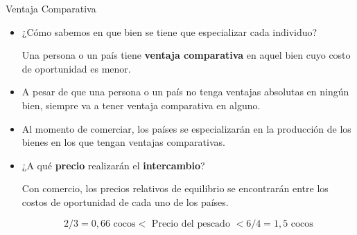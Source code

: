 \documentclass{beamer}
\begin{document}
\begin{frame}{Ventaja Comparativa}
    \begin{itemize}
        \item ¿Cómo sabemos en que bien se tiene que especializar cada individuo?
        \begin{boxB}
            \centering
            Una persona o un país tiene \textbf{ventaja comparativa} en aquel bien cuyo costo de oportunidad es menor.
        \end{boxB}
        \item A pesar de que una persona o un país no tenga ventajas absolutas en ningún bien, siempre va a tener ventaja comparativa en alguno. 
        \item Al momento de comerciar, los países se especializarán en la producción de los bienes en los que tengan ventajas comparativas.
        \item ¿A qué \textbf{precio} realizarán el \textbf{intercambio}?
        \begin{boxB}
            \centering
            Con comercio, los precios relativos de equilibrio se encontrarán
            entre los costos de oportunidad de cada uno de los países.
        \end{boxB}
        \vspace{-8mm}
        \begin{equation*}
            2/3 = 0,66 \text{ cocos} < \text{ Precio del pescado } < 6/4 = 1,5 \text{ cocos}
        \end{equation*}
    \end{itemize}
\end{frame}
\end{document}
